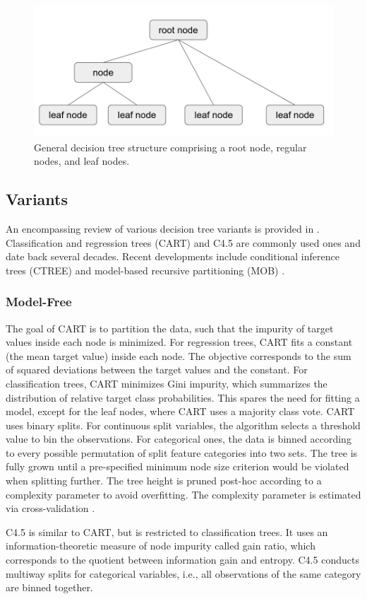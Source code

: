 \documentclass[a4paper, 11pt]{article}
\begin{document}
\begin{figure}
    \centering
    \includegraphics[width = 0.6 \linewidth]{thesis/figure/tree_structure.png}
    \caption{General decision tree structure comprising a root node, regular nodes, and leaf nodes.}
    \label{fig:tree_structure}
\end{figure}

\subsection{Variants}

An encompassing review of various decision tree variants is provided in \cite{loh_trees_review}. 
Classification and regression trees (CART) \cite{cart_1, cart_2, cart_3} and C4.5 \cite{quinlan_c45} are commonly used ones \cite{hastie_elemstatlearn} and date back several decades. Recent developments include conditional inference trees (CTREE) \cite{hothorn_ctree} and model-based recursive partitioning (MOB) \cite{zeileis_mob}.

\subsubsection{Model-Free}

The goal of CART is to partition the data, such that the impurity of target values inside each node is minimized. For regression trees, CART fits a constant (the mean target value) inside each node. The objective corresponds to the sum of squared deviations between the target values and the constant. For classification trees, CART minimizes Gini impurity, which summarizes the distribution of relative target class probabilities. This spares the need for fitting a model, except for the leaf nodes, where CART uses a majority class vote. CART uses binary splits. For continuous split variables, the algorithm selects a threshold value to bin the observations. For categorical ones, the data is binned according to every possible permutation of split feature categories into two sets. The tree is fully grown until a pre-specified minimum node size criterion would be violated when splitting further. The tree height is pruned post-hoc according to a complexity parameter to avoid overfitting. The complexity parameter is estimated via cross-validation \cite{hastie_elemstatlearn}.
\par
C4.5 is similar to CART, but is restricted to classification trees. It uses an information-theoretic measure of node impurity called gain ratio, which corresponds to the quotient between information gain and entropy. C4.5 conducts multiway splits for categorical variables, i.e., all observations of the same category are binned together.
\end{document}

